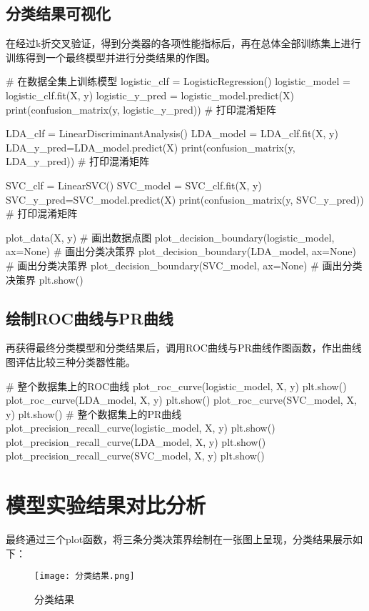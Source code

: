 \documentclass{ctexart}
\begin{document}
\subsection{分类结果可视化}
在经过k折交叉验证，得到分类器的各项性能指标后，再在总体全部训练集上进行训练得到一个最终模型并进行分类结果的作图。
\begin{python}
# 在数据全集上训练模型
logistic_clf = LogisticRegression()
logistic_model = logistic_clf.fit(X, y)
logistic_y_pred = logistic_model.predict(X)
print(confusion_matrix(y, logistic_y_pred))  # 打印混淆矩阵

LDA_clf = LinearDiscriminantAnalysis()
LDA_model = LDA_clf.fit(X, y)
LDA_y_pred=LDA_model.predict(X)
print(confusion_matrix(y, LDA_y_pred))  # 打印混淆矩阵

SVC_clf = LinearSVC()
SVC_model = SVC_clf.fit(X, y)
SVC_y_pred=SVC_model.predict(X)
print(confusion_matrix(y, SVC_y_pred))  # 打印混淆矩阵

plot_data(X, y)   # 画出数据点图
plot_decision_boundary(logistic_model, ax=None)  # 画出分类决策界
plot_decision_boundary(LDA_model, ax=None)  # 画出分类决策界
plot_decision_boundary(SVC_model, ax=None)  # 画出分类决策界
plt.show()
\end{python}

\subsection{绘制ROC曲线与PR曲线}
再获得最终分类模型和分类结果后，调用ROC曲线与PR曲线作图函数，作出曲线图评估比较三种分类器性能。
\begin{python}
# 整个数据集上的ROC曲线
plot_roc_curve(logistic_model, X, y)
plt.show()
plot_roc_curve(LDA_model, X, y)
plt.show()
plot_roc_curve(SVC_model, X, y)
plt.show()
# 整个数据集上的PR曲线
plot_precision_recall_curve(logistic_model, X, y)
plt.show()
plot_precision_recall_curve(LDA_model, X, y)
plt.show()
plot_precision_recall_curve(SVC_model, X, y)
plt.show()
\end{python}

\section{模型实验结果对比分析}

最终通过三个plot函数，将三条分类决策界绘制在一张图上呈现，分类结果展示如下：
\begin{figure}[H]
\texttt{[image: 分类结果.png]}
\caption{分类结果}
\end{figure}
\end{document}
